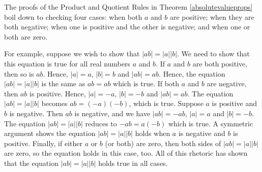 \smallskip


\smallskip

The proofs of the Product and Quotient Rules in Theorem \ref{absolutevalueprops} boil down to checking four cases:  when both $a$ and $b$ are positive;  when they are both negative;  when one is positive and the other is negative; and when one or both are zero.  

\smallskip

For example, suppose we wish to show that $|ab| = |a||b|$.  We need to show that this equation is true for all real numbers $a$ and $b$.  If $a$ and $b$ are both positive, then so is $ab$.  Hence, $|a| = a$, $|b| = b$ and $|ab| = ab$.  Hence, the equation $|ab| = |a||b|$ is the same as $ab = ab$ which is true.  If both $a$ and $b$ are negative, then $ab$ is positive.  Hence, $|a| = -a$, $|b| = -b$ and $|ab| = ab$.  The equation $|ab| = |a||b|$ becomes $ab = (-a)(-b)$, which is true.  Suppose $a$ is positive and $b$ is negative. Then $ab$ is negative, and we have $|ab| = -ab$, $|a| = a$ and $|b| = -b$.  The equation $|ab| = |a||b|$ reduces to $-ab = a(-b)$ which is true.  A symmetric argument shows the equation $|ab| = |a||b|$ holds when $a$ is negative and $b$ is positive.  Finally, if either $a$ or $b$ (or both) are zero, then both sides of $|ab| = |a||b|$ are zero, so the equation holds in this case, too.  All of this rhetoric has shown that the equation $|ab| = |a||b|$ holds true in all cases.  

